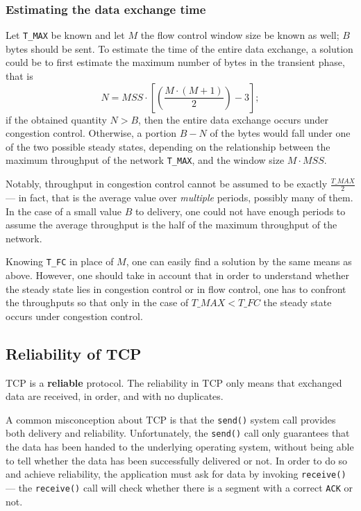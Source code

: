 \documentclass[10pt]{\classname}
\begin{document}
\subsubsection{Estimating the data exchange time}

Let \texttt{T\_MAX} be known and let $M$ the flow control window size be known
as well; $B$ bytes should be sent. To estimate the time of the entire data
exchange, a solution could be to first estimate the maximum number of bytes in
the transient phase, that is $$N = MSS \cdot [(\frac{M \cdot (M + 1)}{2}) -
3];$$ if the obtained quantity $N > B$, then the entire data exchange occurs
under congestion control. Otherwise, a portion $B - N$ of the bytes would fall
under one of the two possible steady states, depending on the relationship
between the maximum throughput of the network \texttt{T\_MAX}, and the window
size $M \cdot MSS$.

Notably, throughput in congestion control cannot be assumed to be exactly
$\frac{T\_MAX}{2}$ --- in fact, that is the average value over \emph{multiple}
periods, possibly many of them. In the case of a small value $B$ to delivery,
one could not have enough periods to assume the average throughput is the half
of the maximum throughput of the network.

Knowing \texttt{T\_FC} in place of $M$, one can easily find a solution by the
same means as above. However, one should take in account that in order to
understand whether the steady state lies in congestion control or in flow
control, one has to confront the throughputs so that only in the case of
$T\_MAX < T\_FC$ the steady state occurs under congestion control.

\subsection{Reliability of TCP}

TCP is a \textbf{reliable} protocol. The reliability in TCP only means that
exchanged data are received, in order, and with no duplicates.

A common misconception about TCP is that the \texttt{send()} system call
provides both delivery and reliability. Unfortunately, the \texttt{send()} call
only guarantees that the data has been handed to the underlying operating
system, without being able to tell whether the data has been successfully
delivered or not. In order to do so and achieve reliability, the application
must ask for data by invoking \texttt{receive()} --- the \texttt{receive()} call
will check whether there is a segment with a correct \texttt{ACK} or not.
\end{document}
